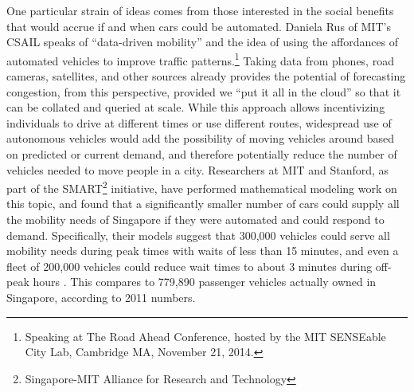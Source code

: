 One particular strain of ideas comes from those interested in the
social benefits that would accrue if and when cars could be automated.
Daniela Rus of MIT's CSAIL speaks of ``data-driven mobility'' and the
idea of using the affordances of automated vehicles to improve traffic
patterns.\footnote{Speaking at The Road Ahead Conference, hosted by
  the MIT SENSEable City Lab, Cambridge MA, November 21, 2014.} Taking
data from phones, road cameras, satellites, and other 
sources already provides the potential of forecasting congestion, from
this perspective,
provided we ``put it all in the cloud'' so that it can be collated and
queried at scale. While this approach allows incentivizing individuals to drive at
different times or use different routes, widespread use of autonomous vehicles would add
the possibility of moving vehicles around based on predicted or
current demand, and therefore potentially reduce the number of
vehicles needed to move people in a city. Researchers at MIT and Stanford, as part of the
SMART\footnote{Singapore-MIT Alliance for Research and Technology} initiative, have
performed mathematical modeling work on this topic, and found that a
significantly smaller number of cars could supply all the mobility
needs of Singapore if they were automated and could respond to demand.
Specifically, their models suggest that 300,000 vehicles could serve
all mobility needs during peak times with waits of less than 15
minutes, and even a fleet of 200,000 vehicles could reduce wait times
to about 3 minutes during off-peak hours \cite{frazzoliSingapore}. This
compares to 779,890 passenger vehicles actually owned in Singapore,
according to 2011 numbers.

